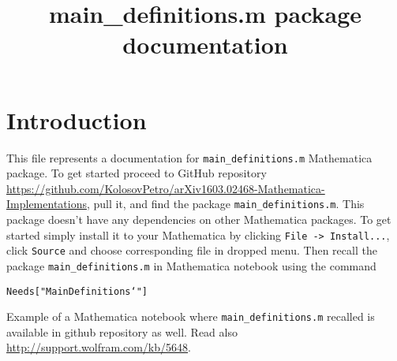 \documentclass[12pt, letterpaper]{amsart}
\title[main\_definitions.m package documentation]
{main\_definitions.m package documentation}
\theoremstyle{definition}
\theoremstyle{remark}
\numberwithin{equation}{section}
\begin{document}
\maketitle
\tableofcontents
\section{Introduction}
This file represents a documentation for \texttt{main\_definitions.m} Mathematica package. To get started proceed to GitHub repository \href{https://github.com/KolosovPetro/arXiv1603.02468-Mathematica-Implementations}
{\textsf{https://github.com/KolosovPetro/arXiv1603.02468-Mathematica-Implementations}}, pull it, and find the package \texttt{main\_definitions.m}. This package doesn't have any dependencies on other Mathematica packages. To get started simply install it to your Mathematica by clicking \verb"File -> Install...", click \verb"Source" and choose corresponding file in dropped menu. Then recall the package \verb"main_definitions.m" in Mathematica notebook using the command

\begin{center}
\texttt{Needs["MainDefinitions`"]}
\end{center}
Example of a Mathematica notebook where \texttt{main\_definitions.m} recalled is available in github repository as well.
Read also \href{http://support.wolfram.com/kb/5648}{\textsf{http://support.wolfram.com/kb/5648}}.
\end{document}
